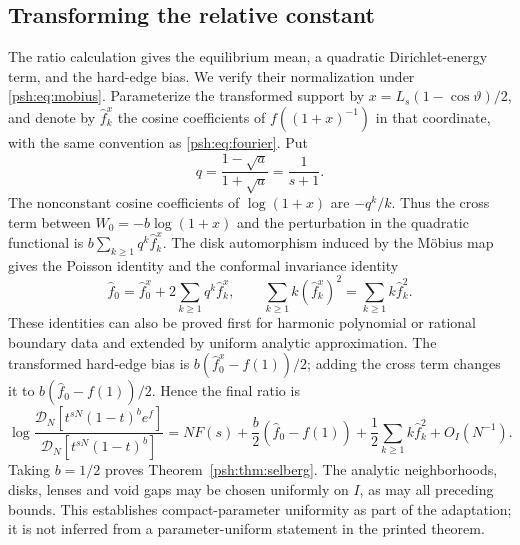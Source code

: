 \documentclass[11pt,a4paper]{article}
\numberwithin{equation}{section}
\theoremstyle{remark}\newtheorem{remark}[theorem]{Remark}
\newcommand{\fh}{\widehat f}
\newcommand{\Dcal}{\mathcal D}
\begin{document}
\subsection{Transforming the relative constant}\label{psh:sec:bias}
The ratio calculation gives the equilibrium mean, a quadratic
Dirichlet-energy term, and the hard-edge bias. We verify their
normalization under \eqref{psh:eq:mobius}.
Parameterize the transformed support by
$x=L_s(1-\cos\vartheta)/2$, and denote by $\fh_k^x$ the cosine coefficients
of $f((1+x)^{-1})$ in that coordinate, with the same convention as
\eqref{psh:eq:fourier}. Put
\[
 q=\frac{1-\sqrt a}{1+\sqrt a}=\frac1{s+1}.
\]
The nonconstant cosine coefficients of $\log(1+x)$ are $-q^k/k$.
Thus the cross term between $W_0=-b\log(1+x)$ and the perturbation in
the quadratic functional is $b\sum_{k\geq1}q^k\fh_k^x$.
The disk automorphism induced by the M\"obius map gives the Poisson
identity and the conformal invariance identity
\begin{equation}\label{psh:eq:poisson}
 \fh_0=\fh_0^x+2\sum_{k\geq1}q^k\fh_k^x,
 \qquad
 \sum_{k\geq1}k(\fh_k^x)^2=\sum_{k\geq1}k\fh_k^2.
\end{equation}
These identities can also be proved first for harmonic polynomial or
rational boundary data and extended by uniform analytic approximation.
The transformed hard-edge bias is $b(\fh_0^x-f(1))/2$; adding the
cross term changes it to $b(\fh_0-f(1))/2$. Hence the final ratio is
\begin{equation}\label{psh:eq:ratio}
 \log\frac{\Dcal_N[t^{sN}(1-t)^b e^f]}
               {\Dcal_N[t^{sN}(1-t)^b]}
 =NF(s)+\frac b2(\fh_0-f(1))
       +\frac12\sum_{k\geq1}k\fh_k^2+O_I(N^{-1}).
\end{equation}
Taking $b=1/2$ proves Theorem~\ref{psh:thm:selberg}.
The analytic neighborhoods, disks, lenses and void gaps may be chosen
uniformly on $I$, as may all preceding bounds. This establishes
compact-parameter uniformity as part of the adaptation; it is not
inferred from a parameter-uniform statement in the printed theorem.
\end{document}
